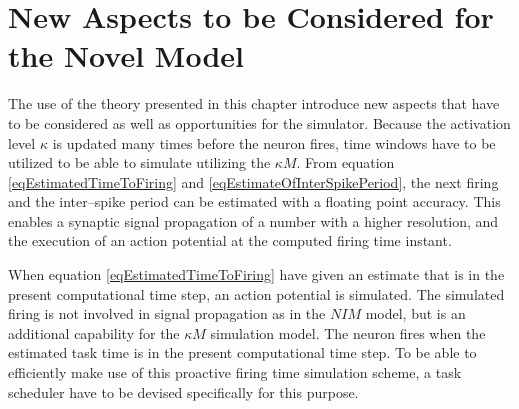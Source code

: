 	\section{New Aspects to be Considered for the Novel Model}
		The use of the theory presented in this chapter introduce new aspects that have to be considered as well as opportunities for the simulator. %
		Because the activation level $\kappa$ is updated many times before the neuron fires, time windows have to be utilized to be able to simulate utilizing the $\kappa M$. %
		From equation \ref{eqEstimatedTimeToFiring} and \ref{eqEstimateOfInterSpikePeriod}, the next firing and the inter--spike period can be estimated with a floating point accuracy.
		This enables a synaptic signal propagation of a number with a higher resolution, and the execution of an action potential at the computed firing time instant.
		
		When equation \ref{eqEstimatedTimeToFiring} have given an estimate that is in the present computational time step, an action potential is simulated.
		The simulated firing is not involved in signal propagation as in the $NIM$ model, but is an additional capability for the $\kappa M$ simulation model.
		The neuron fires when the estimated task time is in the present computational time step.
		To be able to efficiently make use of this proactive firing time simulation scheme, a task scheduler have to be devised specifically for this purpose.



		
